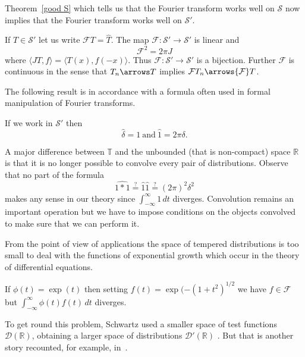 Theorem~\ref{good S} which tells us that the Fourier transform
works well on ${\mathcal S}$ now implies
that the Fourier transform
works well on ${\mathcal S}'$.
\begin{theorem}
If $T\in{\mathcal S}'$ let us write
${\mathcal F}T=\hat{T}$.
The map ${\mathcal F}:{\mathcal S}'\rightarrow{\mathcal S}'$
is linear and
\[{\mathcal F}^{2}=2\pi J\]
where $\langle JT,f\rangle=\langle T(x),f(-x)\rangle$. Thus
${\mathcal F}:{\mathcal S}'\rightarrow{\mathcal S}'$
is a bijection. Further ${\mathcal F}$ is continuous
in the sense that $T_{n}\arrows T$ implies
${\mathcal F}T_{n}\arrows {\mathcal F}T$.
\end{theorem}
The following result is in accordance with a formula
often used in formal manipulation of Fourier transforms.
\begin{exercise} If we work in ${\mathcal S}'$ then
\[\hat{\delta}=1\ \text{and}
\ \hat{1}=2\pi\delta.\]
\end{exercise}

A major difference between ${\mathbb T}$ and the
unbounded (that is non-compact) space ${\mathbb R}$
is that it is no longer possible to convolve every
pair of distributions. Observe that no part of
the formula
\[\widehat{1*1}\overset{?}{=}\hat{1}\hat{1}\overset{?}{=}
(2\pi)^{2}\delta^{2}\]
makes any sense in our theory
since $\int_{-\infty}^{\infty}1\,dt$ diverges.
Convolution remains an important operation
but we have to impose conditions on the
objects convolved to make sure that we
can perform it.

From the point of view of applications the space
of tempered distributions is too small to deal with
the functions of exponential growth which occur in the
theory of differential equations.
\begin{exercise} If $\phi(t)=\exp(t)$ then setting
$f(t)=\exp(-(1+t^{2})^{1/2}$ we have $f\in{\mathcal F}$
but $\int_{-\infty}^{\infty}\phi(t)f(t)\,dt$ diverges.
\end{exercise}
To get round this problem, Schwartz used a smaller
space of test functions ${\mathcal D}({\mathbb R})$,
obtaining a larger space of distributions
${\mathcal D}'({\mathbb R})$ .
But that is another story recounted, for example,
in~\cite{Friedlander}.

